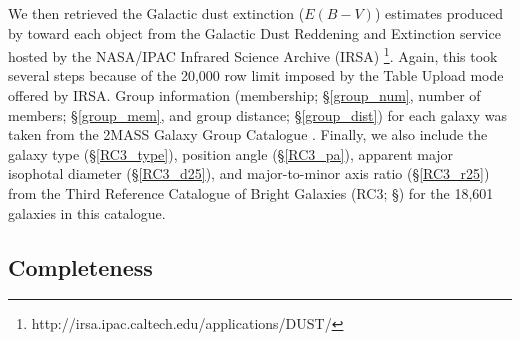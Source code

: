 \documentclass[twocolumn,tighten]{aastex62}
\begin{document}
We then retrieved the Galactic dust extinction ($E(B-V)$) estimates produced by \cite{schlafly2011} toward each object from the Galactic Dust Reddening and Extinction service hosted by the NASA/IPAC Infrared Science Archive (IRSA) \footnote{http://irsa.ipac.caltech.edu/applications/DUST/}. Again, this took several steps because of the 20,000 row limit imposed by the Table Upload mode offered by IRSA. Group information (membership; \S \ref{group_num}, number of members; \S \ref{group_mem}, and group distance; \S \ref{group_dist}) for each galaxy was taken from the 2MASS Galaxy Group Catalogue \cite{tully2015}. Finally, we also include the galaxy type (\S \ref{RC3_type}), position angle (\S \ref{RC3_pa}), apparent major isophotal diameter (\S \ref{RC3_d25}), and major-to-minor axis ratio (\S \ref{RC3_r25}) from the Third Reference Catalogue of Bright Galaxies (RC3; \S \citealt{RC3}) for the 18,601 galaxies in this catalogue.

\subsection{Completeness} \label{completeness}
\end{document}
